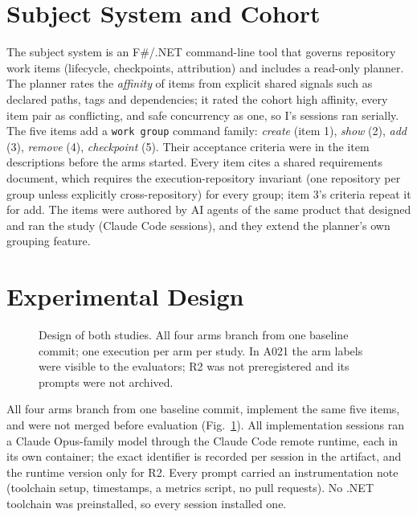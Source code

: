 \documentclass[10pt,conference]{IEEEtran}
\newcommand{\I}{I}
\begin{document}
\section{Subject System and Cohort}\label{sec:subject}

The subject system is an F\#/.NET command-line tool that governs repository work items (lifecycle, checkpoints, attribution) and includes a read-only planner. The planner rates the \emph{affinity} of items from explicit shared signals such as declared paths, tags and dependencies; it rated the cohort high affinity, every item pair as conflicting, and safe concurrency as one, so \I's sessions ran serially. %
The five items add a \texttt{work group} command family: \emph{create} (item 1), \emph{show} (2), \emph{add} (3), \emph{remove} (4), \emph{checkpoint} (5). Their acceptance criteria were in the item descriptions before the arms started. Every item cites a shared requirements document, which requires the execution-repository invariant (one repository per group unless explicitly cross-repository) for every group; item 3's criteria repeat it for add. %
The items were authored by AI agents of the same product that designed and ran the study (Claude Code sessions), and they extend the planner's own grouping feature. %

\section{Experimental Design}\label{sec:design}

\begin{figure}[t]
\centering

\caption{Design of both studies. All four arms branch from one baseline commit; one execution per arm per study. In A021 the arm labels were visible to the evaluators; R2 was not preregistered and its prompts were not archived.}
\label{fig:design}
\end{figure}

All four arms branch from one baseline commit, implement the same five items, and were not merged before evaluation (Fig.~\ref{fig:design}). %
All implementation sessions ran a Claude Opus-family model through the Claude Code remote runtime, each in its own container; the exact identifier is recorded per session in the artifact, and the runtime version only for R2. %
Every prompt carried an instrumentation note (toolchain setup, timestamps, a metrics script, no pull requests). No .NET toolchain was preinstalled, so every session installed one.
\end{document}
